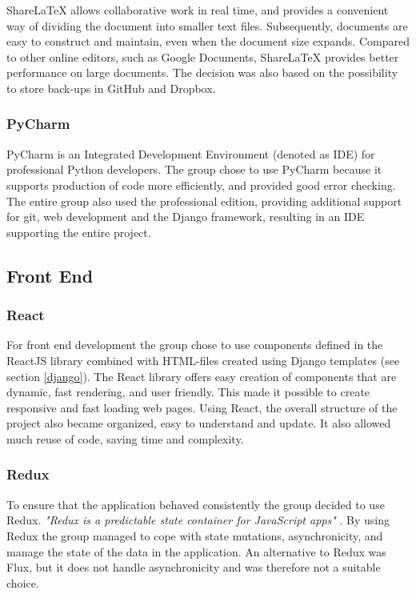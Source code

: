 ShareLaTeX allows collaborative work in real time, and provides a convenient way of dividing the document into smaller text files. Subsequently, documents are easy to construct and maintain, even when the document size expands. Compared to other online editors, such as Google Documents, ShareLaTeX provides better performance on large documents. The decision was also based on the possibility to store back-ups in GitHub and Dropbox.
  
\subsubsection{PyCharm}
PyCharm\cite{PyCharm} is an Integrated Development Environment (denoted as IDE) for professional Python developers. The group chose to use PyCharm because it supports production of code more efficiently, and provided good error checking. The entire group also used the professional edition, providing additional support for git, web development and the Django framework, resulting in an IDE supporting the entire project.

\subsection{Front End}
\label{frontEnd}
\subsubsection{React}
For front end development the group chose to use components defined in the ReactJS library \cite{React} combined with HTML-files created using Django templates (see section \ref{django}). The React library offers easy creation of components that are dynamic, fast rendering, and user friendly. This made it possible to create responsive and fast loading web pages. Using React, the overall structure of the project also became organized, easy to understand and update. It also allowed much reuse of code, saving time and complexity. 

\subsubsection{Redux}
\label{redux}
To ensure that the application behaved consistently the group decided to use Redux. \textit{"Redux is a predictable state container for JavaScript apps"} \cite{Redux}. By using Redux the group managed to cope with state mutations, asynchronicity, and manage the state of the data in the application. An alternative to Redux was Flux, but it does not handle asynchronicity and was therefore not a suitable choice. 

